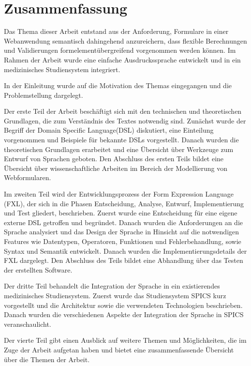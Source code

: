 


\chapter{Zusammenfassung}
\label{chapter_zusammenfassung}

Das Thema dieser Arbeit entstand aus der Anforderung, Formulare in einer Webanwendung semantisch dahingehend anzureichern, dass flexible Berechnungen und Validierungen formelementübergreifend vorgenommen werden können. Im Rahmen der Arbeit wurde eine einfache Ausdruckssprache entwickelt und in ein medizinisches Studiensystem integriert.

In der Einleitung wurde auf die Motivation des Themas eingegangen und die Problemstellung dargelegt.

Der erste Teil der Arbeit beschäftigt sich mit den technischen und theoretischen Grundlagen, die zum Verständnis des Textes notwendig sind. Zunächst wurde der Begriff der Domain Specific Language(DSL) diskutiert, eine Einteilung vorgenommen und Beispiele für bekannte DSLs vorgestellt. Danach wurden die theoretischen Grundlagen erarbeitet und eine Übersicht über Werkzeuge zum Entwurf von Sprachen geboten. Den Abschluss des ersten Teils bildet eine Übersicht über wissenschaftliche Arbeiten im Bereich der Modellierung von Webformularen.

Im zweiten Teil wird der Entwicklungsprozess der Form Expression Language (FXL), der sich in die Phasen Entscheidung, Analyse, Entwurf, Implementierung und Test gliedert, beschrieben. Zuerst wurde eine Entscheidung für eine eigene externe DSL getroffen und begründet. Danach wurden die Anforderungen an die Sprache analysiert und das Design der Sprache in Hinsicht auf die notwendigen Features wie Datentypen, Operatoren, Funktionen und Fehlerbehandlung, sowie Syntax und Semantik entwickelt. Danach wurden die Implementierungsdetails der FXL dargelegt. Den Abschluss des Teils bildet eine Abhandlung über das Testen der erstellten Software.

Der dritte Teil behandelt die Integration der Sprache in ein existierendes medizinisches Studiensystem. Zuerst wurde das Studiensystem SPICS kurz vorgestellt und die Architektur sowie die verwendeten Technologien beschrieben. Danach wurden die verschiedenen Aspekte der Integration der Sprache in SPICS veranschaulicht.

Der vierte Teil gibt einen Ausblick auf weitere Themen und Möglichkeiten, die im Zuge der Arbeit aufgetan haben und bietet eine zusammenfassende Übersicht über die Themen der Arbeit.



